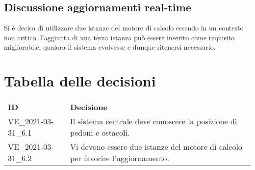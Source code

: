 \documentclass[]{article}
\begin{document}
	\subsection{Discussione aggiornamenti real-time}
 	Si è deciso di utilizzare due istanze del motore di calcolo essendo in un contesto non critico.
 	l'aggiunta di una terza istanza può essere inserito come requisito migliorabile, qualora il sistema evolvesse e dunque ritenersi necessario.
	\newpage

	\section{Tabella delle decisioni}

	\begin{table} [h!]
		\begin{center}
			\begin{tabular} { m{2cm} m{14cm} }
				\rowcolor{lightgray}
				\textbf{ID} & \textbf{Decisione}\\
				VE\_2021-03-31\_6.1 & Il sistema centrale deve conoscere la posizione di pedoni e ostacoli.\\
				VE\_2021-03-31\_6.2 & Vi devono essere due istanze del motore di calcolo per favorire l'aggiornamento.\\

			\end{tabular}
		\end{center}
	\end{table}
\end{document}
